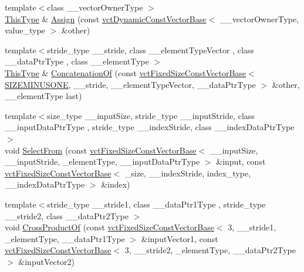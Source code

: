 \begin{DoxyCompactItemize}
\item 
{\footnotesize template$<$class \+\_\+\+\_\+vector\+Owner\+Type $>$ }\\\hyperlink{classvct_fixed_size_const_vector_base_a071063bc4fa43112cc287b2dbef53180}{This\+Type} \& \hyperlink{classvct_fixed_size_vector_base_aa65ad02437ef2ac473a5d5b0de9e48e1}{Assign} (const \hyperlink{classvct_dynamic_const_vector_base}{vct\+Dynamic\+Const\+Vector\+Base}$<$ \+\_\+\+\_\+vector\+Owner\+Type, value\+\_\+type $>$ \&other)
\item 
{\footnotesize template$<$stride\+\_\+type \+\_\+\+\_\+stride, class \+\_\+\+\_\+element\+Type\+Vector , class \+\_\+\+\_\+data\+Ptr\+Type , class \+\_\+\+\_\+element\+Type $>$ }\\\hyperlink{classvct_fixed_size_const_vector_base_a071063bc4fa43112cc287b2dbef53180}{This\+Type} \& \hyperlink{classvct_fixed_size_vector_base_a54bd491ac4979556abab22208213a31a}{Concatenation\+Of} (const \hyperlink{classvct_fixed_size_const_vector_base}{vct\+Fixed\+Size\+Const\+Vector\+Base}$<$ \hyperlink{classvct_fixed_size_vector_base_a62a887358e152bf19a5f474546afa3c3acee84c36d2ff88a921ce7d01e86c4676}{S\+I\+Z\+E\+M\+I\+N\+U\+S\+O\+N\+E}, \+\_\+\+\_\+stride, \+\_\+\+\_\+element\+Type\+Vector, \+\_\+\+\_\+data\+Ptr\+Type $>$ \&other, \+\_\+\+\_\+element\+Type last)
\item 
{\footnotesize template$<$size\+\_\+type \+\_\+\+\_\+input\+Size, stride\+\_\+type \+\_\+\+\_\+input\+Stride, class \+\_\+\+\_\+input\+Data\+Ptr\+Type , stride\+\_\+type \+\_\+\+\_\+index\+Stride, class \+\_\+\+\_\+index\+Data\+Ptr\+Type $>$ }\\void \hyperlink{classvct_fixed_size_vector_base_a51d2bd09e0aaefe5ab1d4d5b1104fa9b}{Select\+From} (const \hyperlink{classvct_fixed_size_const_vector_base}{vct\+Fixed\+Size\+Const\+Vector\+Base}$<$ \+\_\+\+\_\+input\+Size, \+\_\+\+\_\+input\+Stride, \+\_\+element\+Type, \+\_\+\+\_\+input\+Data\+Ptr\+Type $>$ \&input, const \hyperlink{classvct_fixed_size_const_vector_base}{vct\+Fixed\+Size\+Const\+Vector\+Base}$<$ \+\_\+size, \+\_\+\+\_\+index\+Stride, index\+\_\+type, \+\_\+\+\_\+index\+Data\+Ptr\+Type $>$ \&index)
\item 
{\footnotesize template$<$stride\+\_\+type \+\_\+\+\_\+stride1, class \+\_\+\+\_\+data\+Ptr1\+Type , stride\+\_\+type \+\_\+\+\_\+stride2, class \+\_\+\+\_\+data\+Ptr2\+Type $>$ }\\void \hyperlink{classvct_fixed_size_vector_base_ac172908fff49e7f55c1db12ed30da840}{Cross\+Product\+Of} (const \hyperlink{classvct_fixed_size_const_vector_base}{vct\+Fixed\+Size\+Const\+Vector\+Base}$<$ 3, \+\_\+\+\_\+stride1, \+\_\+element\+Type, \+\_\+\+\_\+data\+Ptr1\+Type $>$ \&input\+Vector1, const \hyperlink{classvct_fixed_size_const_vector_base}{vct\+Fixed\+Size\+Const\+Vector\+Base}$<$ 3, \+\_\+\+\_\+stride2, \+\_\+element\+Type, \+\_\+\+\_\+data\+Ptr2\+Type $>$ \&input\+Vector2)

\end{DoxyCompactItemize}
